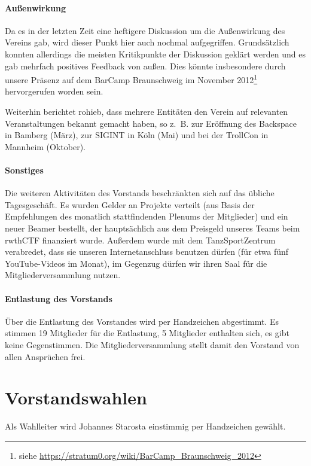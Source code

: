 \documentclass[a4paper,12pt]{scrartcl}
\begin{document}
\paragraph{Außenwirkung}
Da es in der letzten Zeit eine heftigere Diskussion um die Außenwirkung des
Vereins gab, wird dieser Punkt hier auch nochmal aufgegriffen. Grundsätzlich
konnten allerdings die meisten Kritikpunkte der Diskussion geklärt werden und es
gab mehrfach positives Feedback von außen. Dies könnte insbesondere durch unsere
Präsenz auf dem BarCamp Braunschweig im November 2012\footnote{siehe
\url{https://stratum0.org/wiki/BarCamp_Braunschweig_2012}} hervorgerufen worden
sein.

Weiterhin berichtet rohieb, dass mehrere Entitäten den Verein auf relevanten
Veranstaltungen bekannt gemacht haben, so z.~B. zur Eröffnung des Backspace in
Bamberg (März), zur SIGINT in Köln (Mai) und bei der TrollCon in Mannheim
(Oktober).

\paragraph{Sonstiges}
Die weiteren Aktivitäten des Vorstands beschränkten sich auf das übliche
Tagesgeschäft. Es wurden Gelder an Projekte verteilt (aus Basis der Empfehlungen
des monatlich stattfindenden Plenums der Mitglieder) und ein neuer Beamer
bestellt, der hauptsächlich aus dem Preisgeld unseres Teams beim rwthCTF
finanziert wurde. Außerdem wurde mit dem TanzSportZentrum verabredet, dass sie
unseren Internetanschluss benutzen dürfen (für etwa fünf YouTube-Videos im
Monat), im Gegenzug dürfen wir ihren Saal für die Mitgliederversammlung nutzen.

\paragraph{Entlastung des Vorstands}
Über die Entlastung des Vorstandes wird per Handzeichen abgestimmt. Es stimmen
19 Mitglieder für die Entlastung, 5 Mitglieder enthalten sich, es gibt keine
Gegenstimmen. Die Mitgliederversammlung stellt damit den Vorstand von allen
Ansprüchen frei.

\section{Vorstandswahlen}
Als Wahlleiter wird Johannes Starosta einstimmig per Handzeichen gewählt.
\end{document}
